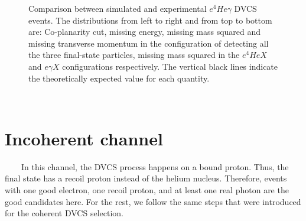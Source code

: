 \begin{figure}[h!]
\caption{Comparison between simulated and experimental $e^{4}He\gamma$ DVCS events. The distributions from left to right and from top to bottom are: Co-planarity cut, missing energy, missing mass squared and missing transverse momentum in the configuration of detecting all the three final-state particles, missing mass squared in the $e^{4}HeX$ and $e\gamma X$ configurations respectively. The vertical black lines indicate the theoretically expected value for each quantity.} 
\label{fig:coh_comparison_with_simulation_2}
\end{figure}

  

~\newpage
~\newpage

\section{Incoherent channel}
~~~~In this channel, the DVCS process happens on a bound proton. Thus, the final state has a recoil proton instead of the helium nucleus. Therefore, events with one good electron, one recoil proton, and at least one real photon are the good candidates here. For the rest, we follow the same steps that were introduced for the coherent DVCS selection.


